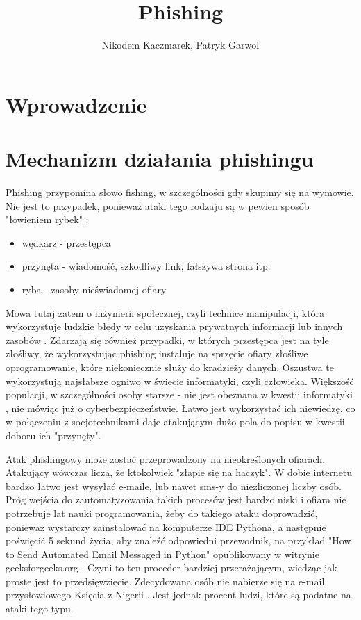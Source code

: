 \documentclass[]{article}
\title{Phishing}
\author{Nikodem Kaczmarek, Patryk Garwol}
\begin{document}
\maketitle

\newpage 

\section{Wprowadzenie}
 \cite{whatIsPhishingCNBC}


\newpage
\section{Mechanizm działania phishingu}

Phishing przypomina słowo fishing, w szczególności gdy skupimy się na wymowie. Nie jest to przypadek, ponieważ ataki tego rodzaju są w pewien sposób "łowieniem rybek" \cite{govpl_phishing}:
\begin{itemize}[label=$\rightarrow$]
	\item wędkarz - przestępca
	\item przynęta - wiadomość, szkodliwy link, fałszywa strona itp.
	\item ryba - zasoby nieświadomej ofiary
\end{itemize} 

Mowa tutaj zatem o inżynierii społecznej, czyli technice manipulacji, która wykorzystuje ludzkie błędy w celu uzyskania prywatnych informacji lub innych zasobów \cite{kaspersky_social_engineering}.
Zdarzają się również przypadki, w których przestępca jest na tyle złośliwy, że wykorzystując phishing instaluje na sprzęcie ofiary złośliwe oprogramowanie, które niekoniecznie służy do kradzieży danych. Oszustwa te wykorzystują najsłabsze ogniwo w świecie informatyki, czyli człowieka. Większość populacji, w szczególności osoby starsze - nie jest obeznana w kwestii informatyki \cite{dsgi_wiley}, nie mówiąc już o cyberbezpieczeństwie. Łatwo jest wykorzystać ich niewiedzę, co w połączeniu z socjotechnikami daje atakującym dużo pola do popisu w kwestii doboru ich "przynęty".

Atak phishingowy może zostać przeprowadzony na nieokreślonych ofiarach. Atakujący wówczas liczą, że ktokolwiek "złapie się na haczyk". W dobie internetu bardzo łatwo jest wysyłać e-maile, lub nawet sms-y do niezliczonej liczby osób. Próg wejścia do zautomatyzowania takich procesów jest bardzo niski i ofiara nie potrzebuje lat nauki programowania, żeby do takiego ataku doprowadzić, ponieważ wystarczy zainstalować na komputerze IDE Pythona, a następnie poświęcić 5 sekund życia, aby znaleźć odpowiedni przewodnik, na przykład "How to Send Automated Email Messaged in Python" opublikowany w witrynie geeksforgeeks.org \cite{geeks4geeks_automaticmails}. Czyni to ten proceder bardziej przerażającym, wiedząc jak proste jest to przedsięwzięcie. Zdecydowana osób nie nabierze się na e-mail przysłowiowego Księcia z Nigerii \cite{nigerian_prince}. Jest jednak procent ludzi, które są podatne na ataki tego typu.
\end{document}
